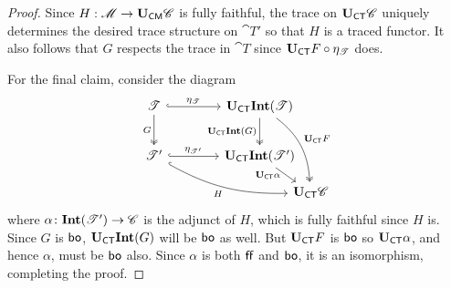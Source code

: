 \documentclass[11pt,oneside,article]{memoir}
\begin{document}
\begin{proof}
   Since $H:\mathscr{M}\to\mathbf{U}_{\mathsf{CM}}\mathscr{C}$ is fully faithful, the trace on $\mathbf{U}_{\mathsf{CT}}\mathscr{C}$ uniquely determines the desired trace structure on $\cat{T}'$ so that $H$ is a traced functor.  It also follows that $G$ respects the trace in $\cat{T}$ since $\mathbf{U}_{\mathsf{CT}} F\circ\eta_{\mathscr{T}}$ does.

   For the final claim, consider the diagram
   \[ \begin{tikzcd}[column sep=4em, row sep=5ex]
      \cat{T} \ar[r,hook,"\eta_{\cat{T}}"] \ar[d,two heads,"G"']
         & \UCT\Int(\cat{T}) \ar[d,two heads,"\UCT\Int(G)"']
            \ar[ddr,two heads,bend left=25,"\UCT F"] &[between origins] \\
      \cat{T}' \ar[r,hook,"\eta_{\cat{T}'}"] \ar[drr,hook,bend right=15,"H"']
         & \UCT\Int(\cat{T}') \ar[dr,"\UCT\alpha"' {inner sep=0pt,pos=.25}] & \\[-10]
      &&\UCT \cat{C}
   \end{tikzcd} \]
   where $\alpha\colon\mathbf{Int}(\mathscr{T}')\to \mathscr{C}$ is the adjunct of $H$, which is fully faithful since $H$ is.  Since $G$ is $\mathsf{bo}$, $\mathbf{U}_{\mathsf{CT}}\mathbf{Int}(G)$ will be $\mathsf{bo}$ as well.  But $\mathbf{U}_{\mathsf{CT}} F$ is $\mathsf{bo}$ so $\mathbf{U}_{\mathsf{CT}} \alpha$, and hence $\alpha$, must be $\mathsf{bo}$ also.  Since $\alpha$ is both $\mathsf{ff}$ and $\mathsf{bo}$, it is an isomorphism, completing the proof.
\end{proof}
\end{document}
